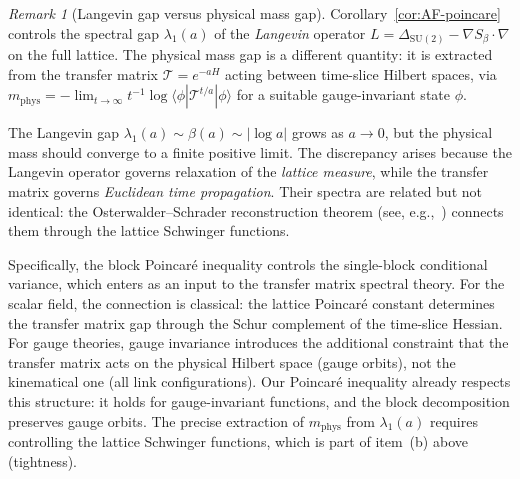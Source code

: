 \documentclass[11pt,a4paper]{article}
\theoremstyle{plain}
\theoremstyle{definition}
\theoremstyle{remark}
\newtheorem{remark}[theorem]{Remark}
\newcommand{\SU}{\mathrm{SU}}
\newcommand{\cT}{\mathcal{T}}
\begin{document}
\begin{remark}[Langevin gap versus physical mass gap]
\label{rem:langevin-vs-mass}
Corollary~\ref{cor:AF-poincare} controls the spectral gap
$\lambda_1(a)$ of the \emph{Langevin} operator
$L = \Delta_{\SU(2)} - \nabla S_\beta \cdot \nabla$ on the
full lattice.  The physical mass gap is a different quantity:
it is extracted from the transfer matrix $\cT = e^{-aH}$
acting between time-slice Hilbert spaces, via
$m_{\mathrm{phys}} = -\lim_{t \to \infty} t^{-1} \log
\langle \phi | \cT^{t/a} | \phi \rangle$
for a suitable gauge-invariant state $\phi$.

The Langevin gap $\lambda_1(a) \sim \beta(a) \sim |\log a|$
grows as $a \to 0$, but the physical mass should converge
to a finite positive limit.  The discrepancy arises because the
Langevin operator governs relaxation of the \emph{lattice
measure}, while the transfer matrix governs \emph{Euclidean
time propagation}.  Their spectra are related but not identical:
the Osterwalder--Schrader reconstruction theorem (see,
e.g.,~\cite{JaffeWitten}) connects them through the lattice
Schwinger functions.

Specifically, the block Poincar\'e inequality controls the
single-block conditional variance, which enters as an input
to the transfer matrix spectral theory.  For the scalar field,
the connection is classical: the lattice Poincar\'e constant
determines the transfer matrix gap through the Schur complement
of the time-slice Hessian.  For gauge theories, gauge invariance
introduces the additional constraint that the transfer matrix
acts on the physical Hilbert space (gauge orbits), not the
kinematical one (all link configurations).  Our Poincar\'e
inequality already respects this structure: it holds for
gauge-invariant functions, and the block decomposition preserves
gauge orbits.  The precise extraction of $m_{\mathrm{phys}}$
from $\lambda_1(a)$ requires controlling the lattice Schwinger
functions, which is part of item~(b) above
(tightness).
\end{remark}
\end{document}
